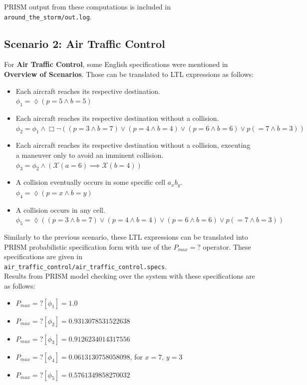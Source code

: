 \documentclass{article}
\begin{document}
PRISM output from these computations is included in \texttt{around\_the\_storm/out.log}.

\subsection*{Scenario 2: Air Traffic Control}

For \textbf{Air Traffic Control}, some English specifications were mentioned in \textbf{Overview of Scenarios}. Those can be translated to LTL expressions as follows:
\begin{itemize}
    \item Each aircraft reaches its respective destination. \\
    $\phi_1= \lozenge (p=5 \land b=5)$
    \item Each aircraft reaches its respective destination without a collision. \\
    $\phi_2= \phi_1 \land \Box\lnot((p=3 \land b=7) \lor (p=4 \land b=4) \lor (p=6 \land b=6) \lor p(=7 \land b=3))$
    \item Each aircraft reaches its respective destination without a collision, executing a maneuver only to avoid an imminent collision. \\
    $\phi_3 = \phi_2 \land (\mathcal{X}(a=6) \implies \mathcal{X}(b=4))$
    \item A collision eventually occurs in some specific cell $a_xb_y$. \\
    $\phi_4 = \lozenge(p=x \land b=y)$
    \item A collision occurs in any cell. \\
    $\phi_5 = \lozenge((p=3 \land b=7) \lor (p=4 \land b=4) \lor (p=6 \land b=6) \lor p(=7 \land b=3))$
\end{itemize}

Similarly to the previous scenario, these LTL expressions can be translated into PRISM probabilistic specification form with use of the $P_{max}=?$ operator. These specifications are given in \\
\texttt{air\_traffic\_control/air\_traffic\_control.specs}.\\

Results from PRISM model checking over the system with these specifications are as follows:
\begin{itemize}
    \item $P_{max}=?[\phi_1] = 1.0$
    \item $P_{max}=?[\phi_2] = 0.9313078531522638$
    \item $P_{max}=?[\phi_3] = 0.9126234014317556$
    \item $P_{max}=?[\phi_4] = 0.0613130758058098$, for $x=7$, $y=3$  
    \item $P_{max}=?[\phi_5] = 0.5761349858270032$
\end{itemize}
\end{document}
